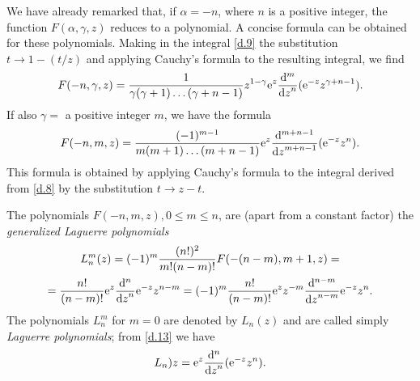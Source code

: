 We have already remarked that, if $ \alpha = -n $, where $ n $ is a positive integer, the function $ F (\alpha, \gamma, z) $ reduces to a polynomial. A concise formula can be obtained for these polynomials. Making in the integral \eqref{d.9} the substitution $ t \to 1-(t/z) $ and applying Cauchy’s formula to the resulting integral, we find
\begin{equation}\label{d.11}
F(-n,\gamma,z)=\frac{1}{\gamma(\gamma+1)\dots(\gamma+n-1)}z^{1-\gamma}\mathrm{e}^z\frac{\mathrm{d}^m}{{\mathrm{d} z}^n}(\mathrm{e}^{-z}z^{\gamma+n-1}).
\end{equation}
If also $ \gamma = $ a positive integer $ m $, we have the formula
\begin{equation}\label{d.12}
F(-n,m,z)=\frac{(-1)^{m-1}}{m(m+1)\dots(m+n-1)}\mathrm{e}^z\frac{\mathrm{d}^{m+n-1}}{{\mathrm{d} z}^{m+n-1}}(\mathrm{e}^{-z}z^n).
\end{equation}
This formula is obtained by applying Cauchy’s formula to the integral derived from \eqref{d.8} by the substitution $ t \to z - t $.

The polynomials $ F (-n, m, z), 0 \leqslant m \leqslant n $, are (apart from a constant factor) the \textit{generalized Laguerre polynomials}
\begin{multline}\label{d.13}
L_n^m(z)=(-1)^m\frac{(n!)^2}{m!(n-m)!}F(-(n-m),m+1,z)=\\
=\frac{n!}{(n-m)!}\mathrm{e}^z\frac{\mathrm{d}^n}{{\mathrm{d} z}^n}\mathrm{e}^{-z}z^{n-m}=(-1)^m\frac{n!}{(n-m)!}\mathrm{e}^zz^{-m}\frac{\mathrm{d}^{n-m}}{{\mathrm{d} z}^{n-m}}\mathrm{e}^{-z}z^n.
\end{multline}
The polynomials $ L_n^m $ for $ m = 0 $ are denoted by $ L_n(z) $ and are called simply \textit{Laguerre polynomials}; from \eqref{d.13} we have
\[ L_n)z =\mathrm{e}^z\frac{\mathrm{d}^n}{{\mathrm{d} z}^n}(\mathrm{e}^{-z}z^n). \]



